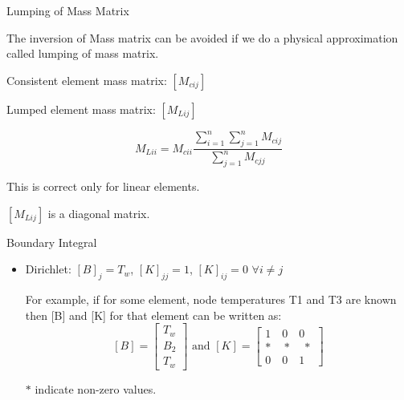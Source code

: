 \documentclass[t,english]{beamer}
\begin{document}
\begin{frame}{Lumping of Mass Matrix}

The inversion of Mass matrix can be avoided if we do a physical approximation called lumping of mass matrix.

Consistent element  mass matrix: $[M_{cij}]$

Lumped element mass matrix: $[M_{Lij}]$

$${ M }_{ Lii }={ M }_{ cii }\frac { \sum _{ i=1 }^{ n }{ \sum _{ j=1 }^{ n }{ { M }_{ cij } }  }  }{ \sum _{ j=1 }^{ n }{ { M }_{ cjj } }  }$$	  

This is correct only for linear elements.

$[M_{Lij}]$ is a diagonal matrix.
\end{frame}

\begin{frame}{Boundary Integral}
\begin{itemize}
\item Dirichlet: $[B]_{j} = T_w$, $[K]_{jj} = 1$, $[K]_{ij} = 0$ $\forall i\neq j$

For example, if for some element, node temperatures T1 and T3 are known then [B] and [K] for that element can be written as:
$$[B] = \begin{bmatrix}
T_w \\
B_2 \\
T_w
\end{bmatrix} \text{  and  } [K] = \begin{bmatrix}
1 \quad 0 \quad 0 \\
\ast \quad \ast \quad \ast \\
0 \quad 0 \quad 1
\end{bmatrix} $$

$\ast$ indicate non-zero values.
\end{itemize}
\end{frame}
\end{document}
